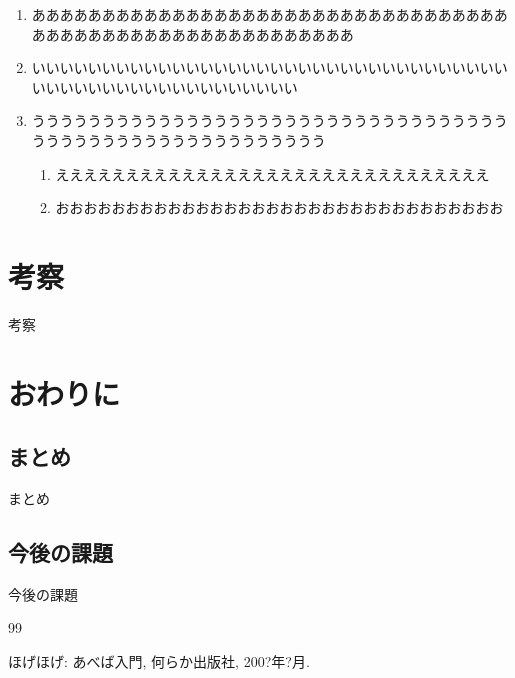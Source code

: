 \documentclass[12pt,dvipdfmx]{jreport}
\begin{document}
\begin{enumerate}
 \item あああああああああああああああああああああああああああああああああああああああああああああああああああああああああ
 \item いいいいいいいいいいいいいいいいいいいいいいいいいいいいいいいいいいいいいいいいいいいいいいいいいいいいい
 \item ううううううううううううううううううううううううううううううううううううううううううううううううううううううう
       \begin{enumerate}
	\item えええええええええええええええええええええええええええええええ
	\item おおおおおおおおおおおおおおおおおおおおおおおおおおおおおおおお
       \end{enumerate}
\end{enumerate}


\chapter{考察}
考察

\chapter{おわりに}
 \section{まとめ}
 まとめ

 \section{今後の課題}
 今後の課題


\begin{thepubbibliography}{99}

 ほげほげ: あべば入門, 何らか出版社, 200?年?月.

\end{thepubbibliography}


%
\end{document}
